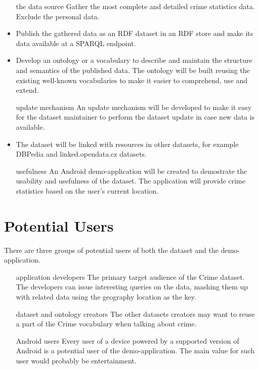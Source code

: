 \begin{itemize}
	\item[the data source] Gather the most complete and detailed crime statistics data.
	Exclude the personal data.
	
	\item Publish the gathered data as an RDF dataset in an RDF store and make its data available at a SPARQL endpoint.
	
	\item Develop an ontology or a vocabulary to describe and maintain the structure and semantics of the published data. The ontology will be built reusing the existing well-known vocabularies to make it easier to comprehend, use and extend.
	
	\item[update mechanism] An update mechanism will be developed to make it easy for the dataset maintainer to perform the dataset update in case new data is available.
	
	\item The dataset will be linked with resources in other datasets, for example DBPedia and linked.opendata.cz datasets.
	
	\item[usefulness] An Android demo-application will be created to demostrate the usability and usefulness of the dataset. The application will provide crime statistics based on the user's current location.
\end{itemize}


\section{Potential Users}
There are three groups of potential users of both the dataset and the demo-application.
\begin{itemize}
	\item[application developers] The primary target audience of the Crime dataset. The developers can issue interesting queries on the data, mashing them up with related data using the geography location as the key.
	
	\item[dataset and ontology creators]
	The other datasets creators may want to reuse a part of the Crime vocabulary when talking about crime.
	
	\item[Android users] Every user of a device powered by a supported version of Android is a potential user of the demo-application. The main value for such user would probably be entertainment.
\end{itemize}
